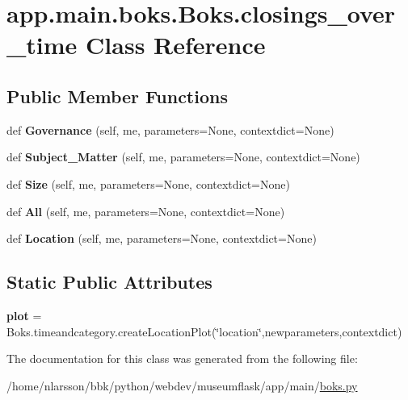 \hypertarget{classapp_1_1main_1_1boks_1_1Boks_1_1closings__over__time}{}\section{app.\+main.\+boks.\+Boks.\+closings\+\_\+over\+\_\+time Class Reference}
\label{classapp_1_1main_1_1boks_1_1Boks_1_1closings__over__time}
\subsection*{Public Member Functions}
\begin{DoxyCompactItemize}
\item 
\mbox{\label{classapp_1_1main_1_1boks_1_1Boks_1_1closings__over__time_a1a99c27f7d0845930fe706ad26cc3fb3}} 
def {\bfseries Governance} (self, me, parameters=None, contextdict=None)
\item 
\mbox{\label{classapp_1_1main_1_1boks_1_1Boks_1_1closings__over__time_a359d58dc14b277e2ecf92a17411f3d36}} 
def {\bfseries Subject\+\_\+\+Matter} (self, me, parameters=None, contextdict=None)
\item 
\mbox{\label{classapp_1_1main_1_1boks_1_1Boks_1_1closings__over__time_a2e4912e28a19b26b9cfd28f87f56fcfa}} 
def {\bfseries Size} (self, me, parameters=None, contextdict=None)
\item 
\mbox{\label{classapp_1_1main_1_1boks_1_1Boks_1_1closings__over__time_a25878330624e2b58af9d22b051943739}} 
def {\bfseries All} (self, me, parameters=None, contextdict=None)
\item 
\mbox{\label{classapp_1_1main_1_1boks_1_1Boks_1_1closings__over__time_aec35ba8ffdcc2bb52986a04012808a07}} 
def {\bfseries Location} (self, me, parameters=None, contextdict=None)
\end{DoxyCompactItemize}
\subsection*{Static Public Attributes}
\begin{DoxyCompactItemize}
\item 
\mbox{\label{classapp_1_1main_1_1boks_1_1Boks_1_1closings__over__time_abcc4150c2384a45d5200e3d529c69da5}} 
{\bfseries plot} = Boks.\+timeandcategory.\+create\+Location\+Plot(\char`\"{}location\char`\"{},newparameters,contextdict)
\end{DoxyCompactItemize}


The documentation for this class was generated from the following file\+:\begin{DoxyCompactItemize}
\item 
/home/nlarsson/bbk/python/webdev/museumflask/app/main/\mbox{\hyperlink{boks_8py}{boks.\+py}}\end{DoxyCompactItemize}
